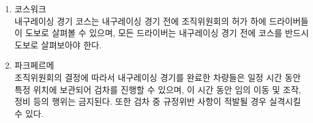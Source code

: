 \documentclass[final,a4paper,10pt]{report}
\begin{document}
{\begin{enumerate}
    \begin{enumerate}
      \item\label{rule:formula-competition.endurance.overtaking.zone-only-under-marshal} 내구레이싱 경기가 진행되는 동안 추월은 경기진행요원의 지시 하에 지정된 추월구간에서만 가능하다.
      \item\label{rule:formula-competition.endurance.overtaking.pass-bypass-lane-procedure} 추월구간은 추월차선과 우회차선의 평행한 2차선으로 구성되며, 추월 차선을 이용하여 우회 차선의 차량을 추월한다. 추월구간에 접근하였을 때 주행이 느린 차량은 청색기를 받게 되며, 우회 차선으로 입구부터 감속하며 진입 후 지시 전까지 정차하며 대기해야 한다. 뒤따르는 빠른 차량은 기존차선을 계속 주행하여 추월한다. 우회 차선으로 진입한 차량은 추월구간 끝에서 주어지는 깃발의 지시를 따라 주행구간으로 재진입해야 한다.
      \item\label{rule:formula-competition.endurance.overtaking.bypass-lane-side-varies} 우회 차선의 위치는 코스의 상황에 따라 우측이나 좌측에 위치할 수 있다.
      \item\label{rule:formula-competition.endurance.overtaking.passing-disabled-cars} 운행이 불가능한 차량이나 트랙을 벗어난 차량을 추월할 경우 드라이버는 주행속도를 줄이고 모든 차량과 경기진행요원의 지시를 따르며 운전하여야 한다.
      \item\label{rule:formula-competition.endurance.overtaking.default-lane-use} 일반적인 주행에서는 모든 차량들은 추월차선을 이용하여 주행한다.
    \end{enumerate}
  \item\label{rule:formula-competition.endurance.course-walk} 코스워크\\
    내구레이싱 경기 코스는 내구레이싱 경기 전에 조직위원회의 허가 하에 드라이버들이 도보로 살펴볼 수 있으며, 모든 드라이버는 내구레이싱 경기 전에 코스를 반드시 도보로 살펴보아야 한다.
  \item\label{rule:formula-competition.endurance.parc-ferme} 파크페르메\\
    조직위원회의 결정에 따라서 내구레이싱 경기를 완료한 차량들은 일정 시간 동안 특정 위치에 보관되어 검차를 진행할 수 있으며, 이 시간 동안 임의 이동 및 조작, 정비 등의 행위는 금지된다. 또한 검차 중 규정위반 사항이 적발될 경우 실격시킬 수 있다.
\end{enumerate}

}
\end{document}
